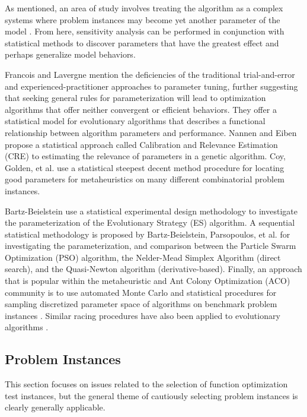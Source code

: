 \documentclass[a4paper, 11pt]{article}
\begin{document}
As mentioned, an area of study involves treating the algorithm as a complex systems where problem instances may become yet another parameter of the model \cite{Saltelli2002, Campolongo2000}. From here, sensitivity analysis can be performed in conjunction with statistical methods to discover parameters that have the greatest effect \cite{Chan1997} and perhaps generalize model behaviors.

Francois and Lavergne \cite{Francois2001} mention the deficiencies of the traditional trial-and-error and experienced-practitioner approaches to parameter tuning, further suggesting	that seeking general rules for parameterization will lead to optimization algorithms that offer neither convergent or efficient behaviors. They offer a statistical model for evolutionary algorithms that describes a functional relationship between algorithm parameters and performance. Nannen and Eiben \cite{Nannen2007, Nannen2006} propose a statistical approach called Calibration and Relevance Estimation (CRE) to estimating the relevance of parameters in a genetic algorithm. Coy, Golden, et al. \cite{Coy2001} use a statistical steepest decent method procedure for locating good parameters for metaheuristics on many different combinatorial problem instances.

Bartz-Beielstein \cite{Bartz-Beielstein2003} use a statistical experimental design methodology to investigate the parameterization of the Evolutionary Strategy (ES) algorithm. A sequential statistical methodology is proposed by Bartz-Beielstein, Parsopoulos, et al. \cite{Bartz-Beielstein2004} for investigating the parameterization, and comparison between the Particle Swarm Optimization (PSO) algorithm, the Nelder-Mead Simplex Algorithm (direct search), and the Quasi-Newton algorithm (derivative-based). Finally, an approach that is popular within the metaheuristic and Ant Colony Optimization (ACO) community is to use automated Monte Carlo and statistical procedures for sampling discretized parameter space of algorithms on benchmark problem instances \cite{Birattari2002}. Similar racing procedures have also been applied to evolutionary algorithms \cite{Yuan2004}.

% 
% 
\subsection{Problem Instances}
This section focuses on issues related to the selection of function optimization test instances, but the general theme of cautiously selecting problem instances is clearly generally applicable.
\end{document}
